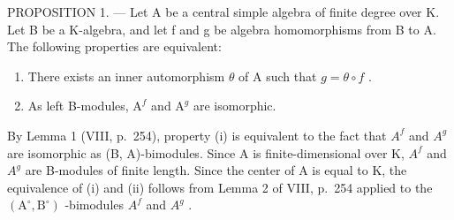 PROPOSITION 1. --- Let A be a central simple algebra of finite degree over K. Let B be a K-algebra, and let f and g be algebra homomorphisms from B to A. The following properties are equivalent:

\begin{enumerate}
\def\labelenumi{(\roman{enumi})}
\item
  There exists an inner automorphism \(\theta\) of A such that \(g = \theta \circ f\) .
\item
  As left B-modules, \(\mathrm{A}^f\) and \(\mathrm{A}^g\) are isomorphic.
\end{enumerate}

By Lemma 1 (VIII, p.~254), property (i) is equivalent to the fact that \(A^{f}\) and \(A^{g}\) are isomorphic as (B, A)-bimodules. Since A is finite-dimensional over K, \(A^{f}\) and \(A^{g}\) are B-modules of finite length. Since the center of A is equal to K, the equivalence of (i) and (ii) follows from Lemma 2 of VIII, p.~254 applied to the \((\mathrm{A}^{\circ}, \mathrm{B}^{\circ})\) -bimodules \(A^{f}\) and \(A^{g}\) .

